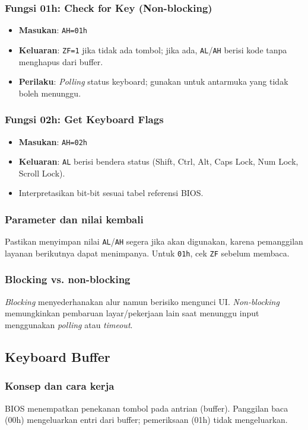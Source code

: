 \subsubsection{Fungsi 01h: Check for Key (Non-blocking)}
\begin{itemize}
  \item \textbf{Masukan}: \texttt{AH=01h}
  \item \textbf{Keluaran}: \texttt{ZF=1} jika tidak ada tombol; jika ada, \texttt{AL}/\texttt{AH} berisi kode tanpa menghapus dari buffer.
  \item \textbf{Perilaku}: \textit{Polling} status keyboard; gunakan untuk antarmuka yang tidak boleh menunggu.
\end{itemize}

\subsubsection{Fungsi 02h: Get Keyboard Flags}
\begin{itemize}
  \item \textbf{Masukan}: \texttt{AH=02h}
  \item \textbf{Keluaran}: \texttt{AL} berisi bendera status (Shift, Ctrl, Alt, Caps Lock, Num Lock, Scroll Lock).
  \item Interpretasikan bit-bit sesuai tabel referensi BIOS.
\end{itemize}

\subsubsection{Parameter dan nilai kembali}
Pastikan menyimpan nilai \texttt{AL}/\texttt{AH} segera jika akan digunakan, karena pemanggilan layanan berikutnya dapat menimpanya. Untuk \texttt{01h}, cek \texttt{ZF} sebelum membaca.

\subsubsection{Blocking vs. non-blocking}
\textit{Blocking} menyederhanakan alur namun berisiko mengunci UI. \textit{Non-blocking} memungkinkan pembaruan layar/pekerjaan lain saat menunggu input menggunakan \textit{polling} atau \textit{timeout}.

\subsection{Keyboard Buffer}
\subsubsection{Konsep dan cara kerja}
BIOS menempatkan penekanan tombol pada antrian (buffer). Panggilan baca (00h) mengeluarkan entri dari buffer; pemeriksaan (01h) tidak mengeluarkan.

